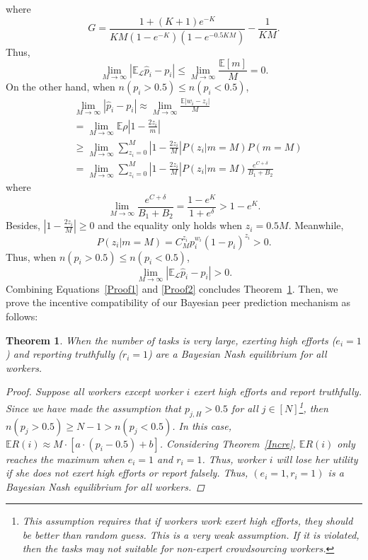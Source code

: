 \documentclass{article}
\newtheorem{theorem}{Theorem}
\begin{document}
where
$$G=\frac{1+(K+1)e^{-K}}{KM(1-e^{-K})(1-e^{-0.5KM})}-\frac{1}{KM}.$$
Thus, 
\begin{equation}
\label{Proof1}
  \lim_{M\rightarrow \infty} |\mathbb{E}_{\mathcal{L}}\hat{p}_i-p_i|\leq \lim_{M\rightarrow \infty} \frac{\mathbb{E}[m]}{M}=0.
\end{equation}
On the other hand, when $n(p_i>0.5)\leq n(p_i<0.5)$,
\begin{equation}
\begin{split}
&\lim_{M\rightarrow \infty} |\hat{p}_i-p_i|\approx \lim_{M\rightarrow \infty} \frac{\mathbb{E}|w_i-z_i|}{M}\\
&= \lim_{M\rightarrow \infty}\mathbb{E}\rho \left|1-\frac{2z_i}{m}\right|\\
&\geq \lim_{M\rightarrow \infty} \sum_{z_i=0}^{M} \left|1-\frac{2z_i}{M}\right|P(z_i|m=M)P(m=M)\\
&= \lim_{M\rightarrow \infty}\sum_{z_i=0}^{M} \left|1-\frac{2z_i}{M}\right|P(z_i|m=M)\frac{e^{C+\delta}}{B_1+B_2}
\end{split}
\end{equation}
where
$$ \lim_{M\rightarrow \infty}\frac{e^{C+\delta}}{B_1+B_2}=\frac{1-e^{K}}{1+e^{\delta}}>1-e^{K}.$$
Besides, $\left|1-\frac{2z_i}{M}\right|\geq 0$ and the equality only holds when $z_i= 0.5M$.
Meanwhile,
$$P(z_i|m=M)=C_{M}^{z_i}p_i^{w_i}(1-p_i)^{z_i}> 0.$$
Thus, when $n(p_i>0.5)\leq n(p_i<0.5)$,
\begin{equation}
\label{Proof2}
\lim_{M\rightarrow \infty} |\mathbb{E}_{\mathcal{L}}\hat{p}_i-p_i|>0.
\end{equation}
Combining Equations~\ref{Proof1} and \ref{Proof2} concludes Theorem~\ref{Conv}.
Then, we prove the incentive compatibility of our Bayesian peer prediction mechanism as follows:
\begin{theorem}
\label{Conv}
When the number of tasks is very large, exerting high efforts ($e_i=1$) and reporting truthfully ($r_i=1$) are a Bayesian Nash equilibrium for all workers.
\begin{proof}
Suppose all workers except worker $i$ exert high efforts and report truthfully. Since we have made the assumption that $p_{j,H}>0.5$ for all $j\in[N]$\footnote{This assumption requires that if workers work exert high efforts, they should be better than random guess. This is a very weak assumption. If it is violated, then the tasks may not suitable for non-expert crowdsourcing workers.}, then $n(p_j>0.5)\geq N-1>n(p_j<0.5)$.
In this case, $\mathbb{E}R(i)\approx M\cdot \left[a\cdot (p_i-0.5) +b\right]$.
Considering Theorem~\ref{Incre}, $\mathbb{E}R(i)$ only reaches the maximum when $e_i=1$ and $r_i=1$.
Thus, worker $i$ will lose her utility if she does not exert high efforts or report falsely. Thus, $(e_i=1,r_i=1)$ is a Bayesian Nash equilibrium for all workers.
\end{proof}
\end{theorem}
\end{document}
